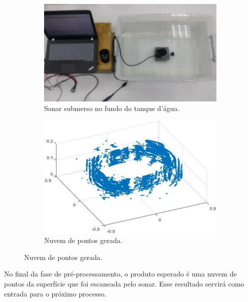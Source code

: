 \begin{figure}[H]
    \centering
    \caption{Nuvem de pontos gerada a partir de dados coletados por um sonar MSIS.}
    \label{fig:point_cloud_example}
    \begin{subfigure}[t]{0.32\textwidth}
        \includegraphics[width=\textwidth]{dados/figuras/point_cloud_example_tank.png}
        \caption{Sonar submerso no fundo do tanque d'água.}
    \end{subfigure}
    \hspace{3em}
    \begin{subfigure}[t]{0.32\textwidth}
        \includegraphics[width=\textwidth]{dados/figuras/point_cloud_example.png}
        \caption{Nuvem de pontos gerada.}
    \end{subfigure}
\end{figure}

No final da fase de pré-processamento, o produto esperado é uma nuvem de pontos da superfície que foi escaneada pelo sonar. Esse resultado servirá como entrada para o próximo processo.

